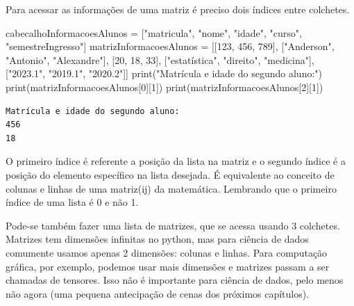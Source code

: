 \documentclass[
  letterpaper,
  DIV=11,
  numbers=noendperiod]{scrreprt}
\newenvironment{Shaded}{\begin{snugshade}}{\end{snugshade}}
\newcommand{\BuiltInTok}[1]{\textcolor[rgb]{0.00,0.23,0.31}{#1}}
\newcommand{\DecValTok}[1]{\textcolor[rgb]{0.68,0.00,0.00}{#1}}
\newcommand{\NormalTok}[1]{\textcolor[rgb]{0.00,0.23,0.31}{#1}}
\newcommand{\OperatorTok}[1]{\textcolor[rgb]{0.37,0.37,0.37}{#1}}
\newcommand{\StringTok}[1]{\textcolor[rgb]{0.13,0.47,0.30}{#1}}
\begin{document}
Para acessar as informações de uma matriz é preciso dois índices entre
colchetes.

\begin{Shaded}
\begin{Highlighting}[]
\NormalTok{cabecalhoInformacoesAlunos }\OperatorTok{=}\NormalTok{ [}\StringTok{"matricula"}\NormalTok{, }\StringTok{"nome"}\NormalTok{, }\StringTok{"idade"}\NormalTok{, }\StringTok{"curso"}\NormalTok{, }\StringTok{"semestreIngresso"}\NormalTok{]}
\NormalTok{matrizInformacoesAlunos }\OperatorTok{=}\NormalTok{ [[}\DecValTok{123}\NormalTok{, }\DecValTok{456}\NormalTok{, }\DecValTok{789}\NormalTok{], [}\StringTok{"Anderson"}\NormalTok{, }\StringTok{"Antonio"}\NormalTok{, }\StringTok{"Alexandre"}\NormalTok{], [}\DecValTok{20}\NormalTok{, }\DecValTok{18}\NormalTok{, }\DecValTok{33}\NormalTok{], [}\StringTok{"estatística"}\NormalTok{, }\StringTok{"direito"}\NormalTok{, }\StringTok{"medicina"}\NormalTok{], [}\StringTok{"2023.1"}\NormalTok{, }\StringTok{"2019.1"}\NormalTok{, }\StringTok{"2020.2"}\NormalTok{]]}
\BuiltInTok{print}\NormalTok{(}\StringTok{"Matrícula e idade do segundo aluno:"}\NormalTok{)}
\BuiltInTok{print}\NormalTok{(matrizInformacoesAlunos[}\DecValTok{0}\NormalTok{][}\DecValTok{1}\NormalTok{])}
\BuiltInTok{print}\NormalTok{(matrizInformacoesAlunos[}\DecValTok{2}\NormalTok{][}\DecValTok{1}\NormalTok{])}
\end{Highlighting}
\end{Shaded}

\begin{tcolorbox}[enhanced jigsaw, breakable, leftrule=.75mm, left=2mm, opacityback=0, bottomrule=.15mm, toprule=.15mm, rightrule=.15mm, arc=.35mm, colback=white]

\begin{verbatim}
Matrícula e idade do segundo aluno:
456
18
\end{verbatim}

\end{tcolorbox}

O primeiro índice é referente a posição da lista na matriz e o segundo
índice é a posição do elemento específico na lista desejada. É
equivalente ao conceito de colunas e linhas de uma matriz(ij) da
matemática. Lembrando que o primeiro índice de uma lista é 0 e não 1.

Pode-se também fazer uma lista de matrizes, que se acessa usando 3
colchetes. Matrizes tem dimensões infinitas no python, mas para ciência
de dados comumente usamos apenas 2 dimensões: colunas e linhas. Para
computação gráfica, por exemplo, podemos usar mais dimensões e matrizes
passam a ser chamadas de tensores. Isso não é importante para ciência de
dados, pelo menos não agora (uma pequena antecipação de cenas dos
próximos capítulos).
\end{document}
